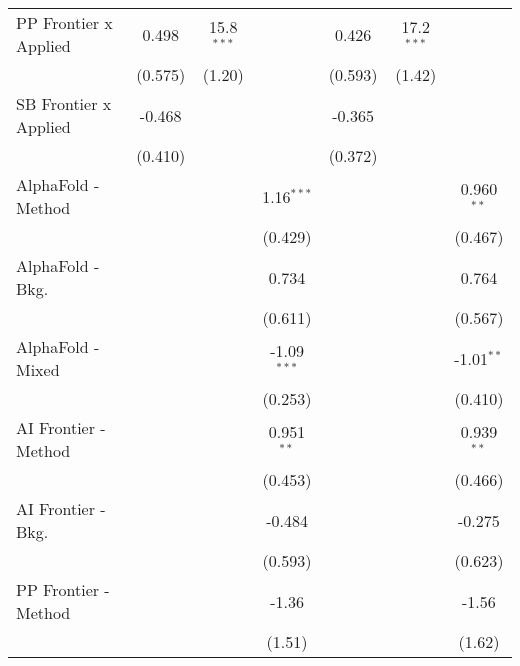 \begin{tabular}{lcccccc}
   PP Frontier x Applied        & 0.498          & 15.8$^{***}$  &               & 0.426          & 17.2$^{***}$  &   \\   
                                & (0.575)        & (1.20)        &               & (0.593)        & (1.42)        &   \\   
   SB Frontier x Applied        & -0.468         &               &               & -0.365         &               &   \\   
                                & (0.410)        &               &               & (0.372)        &               &   \\   
   AlphaFold - Method           &                &               & 1.16$^{***}$  &                &               & 0.960$^{**}$\\   
                                &                &               & (0.429)       &                &               & (0.467)\\   
   AlphaFold - Bkg.             &                &               & 0.734         &                &               & 0.764\\   
                                &                &               & (0.611)       &                &               & (0.567)\\   
   AlphaFold - Mixed            &                &               & -1.09$^{***}$ &                &               & -1.01$^{**}$\\   
                                &                &               & (0.253)       &                &               & (0.410)\\   
   AI Frontier - Method         &                &               & 0.951$^{**}$  &                &               & 0.939$^{**}$\\   
                                &                &               & (0.453)       &                &               & (0.466)\\   
   AI Frontier - Bkg.           &                &               & -0.484        &                &               & -0.275\\   
                                &                &               & (0.593)       &                &               & (0.623)\\   
   PP Frontier - Method         &                &               & -1.36         &                &               & -1.56\\   
                                &                &               & (1.51)        &                &               & (1.62)\\   

\end{tabular}
